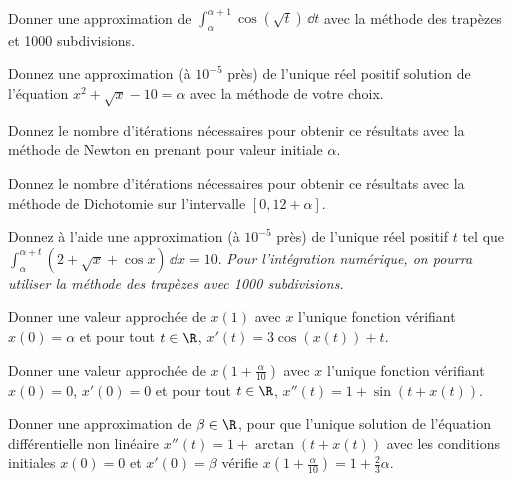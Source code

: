 \exer{[SATIO-005]}
\setcounter{numques}{0}~\\

\question{} Donner une approximation de $\int_{\alpha}^{\alpha+1} \cos(\sqrt{t})\, \dd t$ avec la méthode des trapèzes et 1000 subdivisions.


\question{}  Donnez une approximation (à $10^{-5}$ près) de l'unique réel positif solution de
  l'équation $x^{2}+\sqrt{x}-10 = \alpha$ avec la méthode de votre choix.
  
  \question{}
  Donnez le nombre d'itérations nécessaires pour obtenir ce résultats avec la méthode de Newton en prenant pour valeur initiale $\alpha$.
  
\question{}
  Donnez le nombre d'itérations nécessaires pour obtenir ce résultats avec la méthode de Dichotomie sur l'intervalle $\left[0,12+\alpha\right]$.



\question{}
  Donnez à l'aide une approximation (à $10^{-5}$ près) de l'unique réel positif $t$ tel que $    \int_{\alpha}^{\alpha+t} (2+\sqrt{x}+\cos x)\, \dd x = 10$.
  \textit{Pour l'intégration numérique, on pourra utiliser la méthode des trapèzes avec 1000 subdivisions.}
  


\question{}
  Donner une valeur approchée de $x(1)$ avec $x$ l'unique fonction
  vérifiant $x(0)=\alpha$ et pour tout $t\in \R$, $x'(t) = 3\cos(x(t))
  + t$.


\question{}
  Donner une valeur approchée de $x\left(1+\frac{\alpha}{10}\right)$ avec $x$ l'unique fonction
  vérifiant $x(0)=0$, $x'(0)=0$ et pour tout $t\in \R$, $x''(t) = 1 + \sin(t+x(t))$.

\question{}
  Donner une approximation de $\beta\in \R$, pour que l'unique
  solution de l'équation différentielle non linéaire $x''(t)=
  1+\arctan(t+x(t))$ avec les conditions initiales $x(0)=0$ et
  $x'(0)=\beta$ vérifie    $x\left(1+\frac{\alpha}{10}\right) = 1 + \frac{2}{3}\alpha$.
